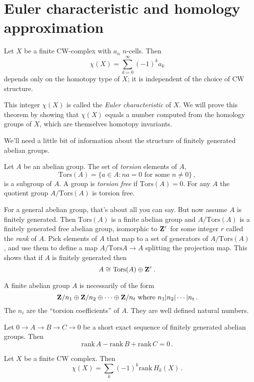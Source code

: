 \section{Euler characteristic and homology approximation}


\begin{theorem} Let $X$ be a finite CW-complex with $a_n$ $n$-cells. Then 
\[
\chi(X)=\sum^\infty_{k=0}(-1)^k a_k
\]
depends only on the homotopy type of $X$; it is independent of the choice of
CW structure. 
\end{theorem}
This integer $\chi(X)$ is called the {\em Euler characteristic} of $X$. We will prove this theorem by showing that $\chi(X)$ equals a number computed from the homology groups of $X$, which are themselves homotopy invariants. 

We'll need a little bit of information about the structure of finitely generated abelian groups.

Let $A$ be an abelian group. The set of {\em torsion} elements of $A$,
\[
\mathrm{Tors}(A)=\{a\in A:na=0\,\,\text{for some}\,\,n\neq0\}\,,
\]
is a subgroup of $A$. A group is \emph{torsion free}
if $\mathrm{Tors}(A)=0$. For any $A$ the quotient group 
$A/\mathrm{Tors}(A)$ is torsion free. 

For a general abelian group, that's about all you can say. But now assume $A$ is finitely generated. Then $\mathrm{Tors}(A)$ is a finite abelian group and
$A/\mathrm{Tors}(A)$ is a finitely generated free abelian group, isomorphic to $\mathbf Z^r$ for some integer $r$ called the \emph{rank} of $A$. Pick elements of
$A$ that map to a set of generators of $A/\mathrm{Tors}(A)$, and use them
to define a map $A/\mathrm{Tors}A\to A$ splitting the projection map. This shows that if $A$ is finitely generated then
\[
A\cong\mathrm{Tors}(A)\oplus\mathbf Z^r\,.
\]

A finite abelian group $A$ is necessarily of the form 
\[
\mathbf Z/n_1\oplus\mathbf Z/n_2\oplus\cdots\oplus\mathbf Z/n_t\,\,\hbox{where}\,\,
n_1|n_2|\cdots|n_t\,.
\]
The $n_i$ are the ``torsion coefficients'' of $A$. 
They are well defined natural numbers.

\begin{lemma} Let $0\to A\to B\to C\to 0$ be a short exact sequence of finitely
generated abelian groups. Then
\[
\mathrm{rank}\,A-\mathrm{rank}\,B+\mathrm{rank}\,C=0\,.
\]
\end{lemma}

\begin{theorem} Let $X$ be a finite CW complex. Then
\[
\chi(X)=\sum_k(-1)^k\mathrm{rank}\,H_k(X)\,.
\]
\end{theorem}

